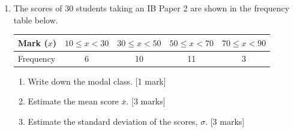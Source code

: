 \documentclass[12pt, twoside]{article}
\begin{document}
\begin{enumerate}
  \item The scores of 30 students taking an IB Paper 2 are shown in the frequency table below.
    
    \begin{tabular}{|l|c|c|c|c|}
      \hline
      Mark ($x$) & $10 \leq x < 30$ & $30 \leq x < 50$ & $50 \leq x < 70$ & $70 \leq x < 90$\\ 
      \hline 
      Frequency & 6 & 10 & 11 & 3\\ 
      \hline 
      \end{tabular}

    \begin{enumerate}
      \item Write down the modal class.  \hfill [1 mark]  \vspace{2cm}
      \item Estimate the mean score $\overline{x}$. \hfill [3 marks] \vspace{2cm}
      \item Estimate the standard deviation of the scores, $\sigma$.  \hfill [3 marks] \vspace{1cm}
    \end{enumerate}

\end{enumerate}
\end{document}
